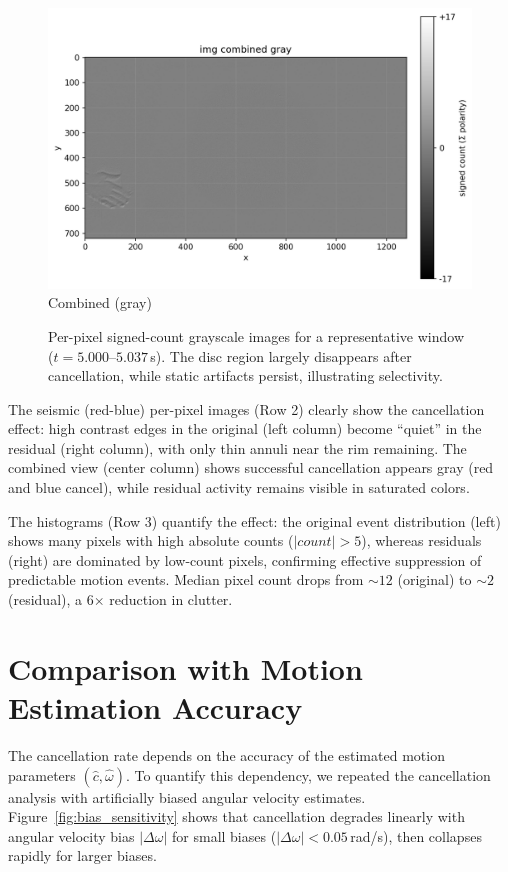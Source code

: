 \begin{figure}[t]
\begin{minipage}[t]{0.32\linewidth}
    \includegraphics[width=\linewidth]{images/main_results/window1/img_combined_gray.png}\\[-2pt]
    \footnotesize Combined (gray)
  \end{minipage}
\caption{Per-pixel signed-count grayscale images for a representative window ($t=5.000$--$5.037$\,s). The disc region largely disappears after cancellation, while static artifacts persist, illustrating selectivity.}
  \label{fig:highpass_panel}
\end{figure}

The seismic (red-blue) per-pixel images (Row 2) clearly show the cancellation effect: high contrast edges in the original (left column) become ``quiet'' in the residual (right column), with only thin annuli near the rim remaining. The combined view (center column) shows successful cancellation appears gray (red and blue cancel), while residual activity remains visible in saturated colors.

The histograms (Row 3) quantify the effect: the original event distribution (left) shows many pixels with high absolute counts ($|count| > 5$), whereas residuals (right) are dominated by low-count pixels, confirming effective suppression of predictable motion events. Median pixel count drops from $\sim 12$ (original) to $\sim 2$ (residual), a 6$\times$ reduction in clutter.

\section{Comparison with Motion Estimation Accuracy}

The cancellation rate depends on the accuracy of the estimated motion parameters $(\hat c,\hat\omega)$. To quantify this dependency, we repeated the cancellation analysis with artificially biased angular velocity estimates. Figure~\ref{fig:bias_sensitivity} shows that cancellation degrades linearly with angular velocity bias $|\Delta\omega|$ for small biases ($|\Delta\omega| < 0.05$\,rad/s), then collapses rapidly for larger biases.

